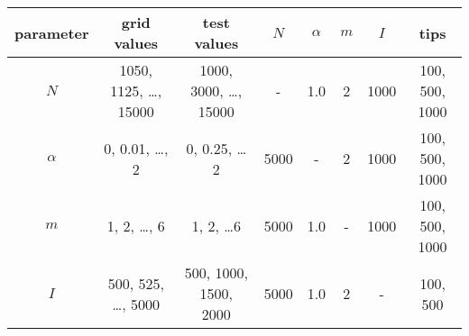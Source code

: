 \begin{tabular}{cccccccc}
  parameter & grid values & test values & $N$ & $\alpha$ & $m$ & $I$ & tips \\
  \hline
  $N$ & 1050, 1125, \ldots, 15000 & 1000, 3000, \ldots, 15000 & - & 1.0 & 2 & 1000 & 100, 500, 1000 \\
  $\alpha$ & 0, 0.01, \ldots, 2 & 0, 0.25, \ldots 2 & 5000 & - & 2 & 1000 & 100, 500, 1000 \\
  $m$ & 1, 2, \ldots, 6 & 1, 2, \ldots 6 & 5000 & 1.0 & - & 1000 & 100, 500, 1000 \\
  $I$ & 500, 525, \ldots, 5000 & 500, 1000, 1500, 2000 & 5000 & 1.0 & 2 & - & 100, 500 \\
  \hline
\end{tabular}
